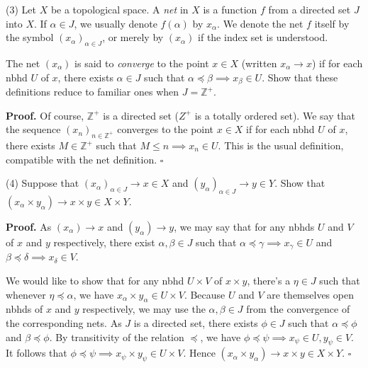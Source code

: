 \documentclass[a4paper]{article}
\newcommand{\Z}{\mathbb{Z}}
\begin{document}
\vspace{0.5cm}

(3) Let $X$ be a topological space. A \emph{net} in $X$ is a function $f$ from a directed set $J$ into $X$. If $\alpha \in J$, we usually denote $f(\alpha)$ by $x_\alpha$. We denote the net $f$ itself by the symbol $(x_\alpha)_{\alpha \in J}$, or merely by $(x_\alpha)$ if the index set is understood.

The net $(x_\alpha)$ is said to \emph{converge} to the point $x \in X$ (written $x_\alpha \to x$) if for each nbhd $U$ of $x$, there exists $\alpha \in J$ such that $\alpha \preceq \beta \implies x_\beta \in U$. Show that these definitions reduce to familiar ones when $J = \Z^+$.

\textbf{Proof.} Of course, $\Z^+$ is a directed set ($Z^+$ is a totally ordered set). We say that the sequence $(x_n)_{n \in \Z^+}$ converges to the point $x \in X$ if for each nbhd $U$ of $x$, there exists $M \in \Z^+$ such that $M \leq n \implies x_n \in U$. This is the usual definition, compatible with the net definition. $\square$

\vspace{0.5cm}

(4) Suppose that $(x_\alpha)_{\alpha \in J} \to x \in X$ and $(y_\alpha)_{\alpha \in J} \to y \in Y$. Show that $(x_\alpha \times y_\alpha) \to x \times y \in X \times Y$.

\textbf{Proof.} As $(x_\alpha) \to x$ and $(y_\alpha) \to y$, we may say that for any nbhds $U$ and $V$ of $x$ and $y$ respectively, there exist $\alpha, \beta \in J$ such that $\alpha \preceq \gamma \implies x_\gamma \in U$ and $\beta \preceq \delta \implies x_\delta \in V$.

We would like to show that for any nbhd $U \times V$ of $x \times y$, there's a $\eta \in J$ such that whenever $\eta \preceq \alpha$, we have $x_\alpha \times y_\alpha \in U \times V$. Because $U$ and $V$ are themselves open nbhds of $x$ and $y$ respectively, we may use the $\alpha, \beta \in J$ from the convergence of the corresponding nets. As $J$ is a directed set, there exists $\phi \in J$ such that $\alpha \preceq \phi$ and $\beta \preceq \phi$. By transitivity of the relation $\preceq$, we have $\phi \preceq \psi \implies x_\psi \in U, y_\psi \in V$. It follows that $\phi \preceq \psi \implies x_\psi \times y_\psi \in U \times V$. Hence $(x_\alpha \times y_\alpha) \to x \times y \in X \times Y$. $\square$

\vspace{0.5cm}
\end{document}
